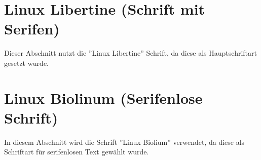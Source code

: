 \documentclass{scrartcl}
\begin{document}
\section{Linux Libertine (Schrift mit Serifen)}
Dieser Abschnitt nutzt die ''Linux Libertine'' Schrift, da diese als Hauptschriftart gesetzt wurde.
\section{Linux Biolinum (Serifenlose Schrift)}
\textsf{In diesem Abschnitt wird die Schrift ''Linux Biolium'' verwendet, da diese als Schriftart für serifenlosen Text gewählt wurde.}
\end{document}
